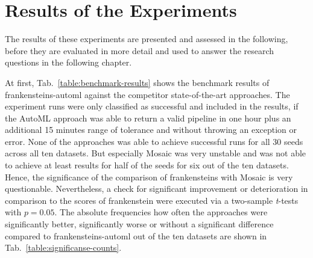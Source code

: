 \section{Results of the Experiments}
\label{sec:evaluation:results}
 The results of these experiments are presented and assessed in the following, before they are evaluated in more detail and used to answer the research questions in the following chapter.

 At first, Tab.~\ref{table:benchmark-results} shows the benchmark results of frankensteins-automl against the competitor state-of-the-art approaches.
 The experiment runs were only classified as successful and included in the results, if the AutoML approach was able to return a valid pipeline in one hour plus an additional 15 minutes range of tolerance and without throwing an exception or error.\newline
 None of the approaches was able to achieve successful runs for all 30 seeds across all ten datasets.
 But especially Mosaic was very unstable and was not able to achieve at least results for half of the seeds for six out of the ten datasets.
 Hence, the significance of the comparison of frankensteins with Mosaic is very questionable.\newline
 Nevertheless, a check for significant improvement or deterioration in comparison to the scores of frankenstein were executed via a two-sample \textit{t}-tests with $p = 0.05$.
 The absolute frequencies how often the approaches were significantly better, significantly worse or without a significant difference compared to frankensteins-automl out of the ten datasets are shown in Tab.~\ref{table:significanse-counts}.


